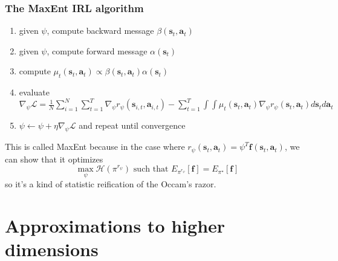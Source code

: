 \documentclass{report}
\begin{document}
\subsubsection{The MaxEnt IRL algorithm}
\begin{enumerate}
		\item given $ \psi  $, compute backward message $ \beta (\bm{s}_{t}, \bm{a}_{t} )  $
		\item given $ \psi  $, compute forward message $ \alpha (\bm{s}_{t})  $
		\item compute $ \mu_{ t }(\bm{s}_{t}, \bm{a}_{t} ) \propto \beta (\bm{s}_{t}, \bm{a}_{t} ) \alpha (\bm{s}_{t})$
		\item evaluate $ \nabla_{ \psi } \mathcal{L} = \frac{1}{N} \sum_{i=1}^{N} \sum_{t=1}^{T} \nabla_{ \psi }r_{ \psi } (\bm{s}_{i,t}, \bm{a}_{i,t} )
				- \sum_{t=1}^{T} \int \int \mu_{ t }(\bm{s}_{t}, \bm{a}_{t} )\nabla_{ \psi }r_{ \psi }(\bm{s}_{t}, \bm{a}_{t} )d\bm{s}_{t}d\bm{a}_{t}$
		\item $ \psi \leftarrow \psi + \eta \nabla_{ \psi } \mathcal{L}  $ and repeat until convergence
\end{enumerate}

This is called MaxEnt because in the case where
$ r_{ \psi }(\bm{s}_{t}, \bm{a}_{t} ) = \psi^{ T } \bm{f}_{}(\bm{s}_{t}, \bm{a}_{t} )  $,
we can show that it optimizes
\begin{equation}
	\max_{\psi} \mathcal{H} (\pi^{ r_{ \psi } }) \text{ such that } E_{ \pi^{ r_{ \psi } } } \left[ \bm{f}_{} \right] = E_{ \pi^{ \star } } \left[ \bm{f}_{} \right] 	
\end{equation}
so it's a kind of statistic reification of the Occam's razor.

\section{Approximations to higher dimensions}
\end{document}
